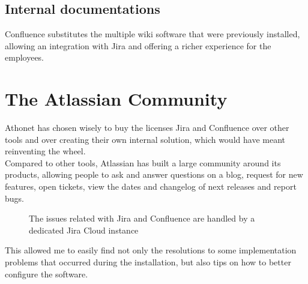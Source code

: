 	\subsection{Internal documentations}
		Confluence substitutes the multiple wiki software that were previously installed, allowing an integration with Jira and offering a richer experience for the employees.
	
\section{The Atlassian Community}\label{sec:atlassian_community}
	Athonet has chosen wisely to buy the licenses Jira and Confluence over other tools and over creating their own internal solution, which would have meant reinventing the wheel.\\
	Compared to other tools, Atlassian has built a large community around its products, allowing people to ask and answer questions on a blog, request for new features, open tickets, view the dates and changelog of next releases and report bugs.
	\begin{figure}[H]
		\centering
		\caption{The issues related with Jira and Confluence are handled by a dedicated Jira Cloud instance}
	\end{figure}
	This allowed me to easily find not only the resolutions to some implementation problems that occurred during the installation, but also tips on how to better configure the software.

